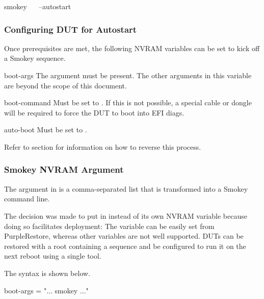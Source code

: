 \begin{CommandLine}
smokey ~~ --autostart
\end{CommandLine}

\subsubsection{Configuring DUT for Autostart}

Once prerequisites are met, the following NVRAM variables can be set to kick
off a Smokey sequence.

\begin{Descriptive}

	\item[boot-args] The  argument must be present.  The
	other arguments in this variable are beyond the scope of this document.

	\item[boot-command] Must be set to .  If this is not
	possible, a special cable or dongle will be required to force the DUT
	to boot into EFI diags.

	\item[auto-boot] Must be set to .

\end{Descriptive}

Refer to section  for information on how to
reverse this process.

\subsubsection{Smokey NVRAM Argument}

The  argument in  is a comma-separated list that
is transformed into a Smokey command line.

The decision was made to put  in  instead of its
own NVRAM variable because doing so facilitates deployment:  The
 variable can be easily set from PurpleRestore, whereas other
variables are not well supported.  DUTs can be restored with a root containing
a sequence and be configured to run it on the next reboot using a single tool.

The  syntax is shown below.

\begin{Setting}
boot-args = "... smokey ..."
\end{Setting}


